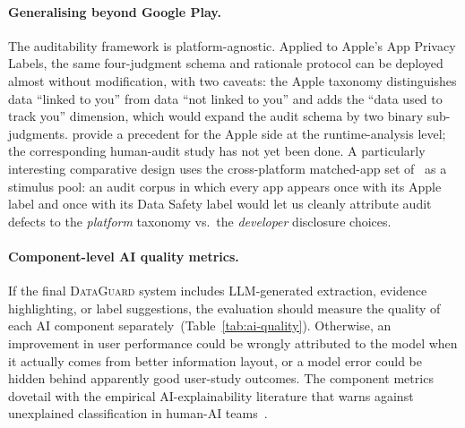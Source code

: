 \documentclass[11pt,a4paper]{article}
\newcommand{\dataguard}{\textsc{DataGuard}}
\begin{document}
\paragraph{Generalising beyond Google Play.}
The auditability framework is platform-agnostic. Applied to Apple's
App Privacy Labels, the same four-judgment schema and rationale
protocol can be deployed almost without modification, with two
caveats: the Apple taxonomy distinguishes data ``linked to you'' from
data ``not linked to you'' and adds the ``data used to track you''
dimension, which would expand the audit schema by two binary
sub-judgments. \citet{xiao2023lalaine} provide a precedent for the
Apple side at the runtime-analysis level; the corresponding human-audit
study has not yet been done. A particularly interesting comparative
design uses the cross-platform matched-app set
of~\citet{khandelwal2023comparing} as a stimulus pool: an audit corpus
in which every app appears once with its Apple label and once with its
Data Safety label would let us cleanly attribute audit defects to the
\emph{platform} taxonomy vs.\ the \emph{developer} disclosure choices.

\paragraph{Component-level AI quality metrics.}
If the final \dataguard{} system includes LLM-generated extraction,
evidence highlighting, or label suggestions, the evaluation should
measure the quality of each AI component
separately~(Table~\ref{tab:ai-quality}). Otherwise, an improvement in
user performance could be wrongly attributed to the model when it
actually comes from better information layout, or a model error could
be hidden behind apparently good user-study outcomes. The component
metrics dovetail with the empirical AI-explainability literature that
warns against unexplained classification in
human-AI teams~\citep{bansal2021does,liao2020questioning}.
\end{document}
